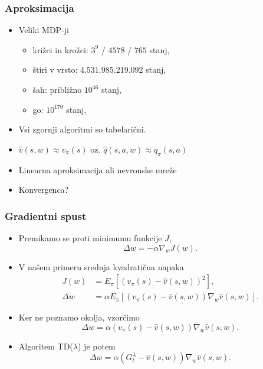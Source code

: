 \documentclass{beamer}    %
\begin{document}
\begin{frame}
    \frametitle{Aproksimacija}
    \begin{itemize}
        \item Veliki MDP-ji 
                \begin{itemize}
                    \item križci in krožci: $3^9$ / $4578$ / $765$ stanj, 
                    \item štiri v vrsto: $4.531.985.219.092$ stanj,
                    \item šah: približno $10^{46}$ stanj, 
                    \item go: $10^{170}$ stanj, 
                \end{itemize}
        \medskip
        \medskip
        \item Vsi zgornji algoritmi so tabelarični.
        \item $\hat{v}(s, w) \approx v_\pi(s)$ oz. $\hat{q}(s, a, w) \approx q_\pi(s, a)$
        \item Linearna aproksimacija ali nevronske mreže
        \item Konvergenca?
    \end{itemize}
\end{frame}


\begin{frame}
    \frametitle{Gradientni spust}
    \begin{itemize}
        \item Premikamo se proti minimumu funkcije $J$, 
            $$
            \Delta w = - \alpha \nabla_wJ(w).
            $$
        \item V našem primeru srednja kvadratična napaka
            \begin{align*}
                J(w) &= E_\pi [(v_\pi(s) - \hat{v}(s, w))^2], \\
                \Delta w &= \alpha E_\pi [(v_\pi(s) - \hat{v}(s, w)) \nabla_w \hat{v}(s, w)].
            \end{align*}
        \item Ker ne poznamo okolja, vzorčimo
            $$
            \Delta w = \alpha (v_\pi(s) - \hat{v}(s, w)) \nabla_w \hat{v}(s, w).
            $$
        \item Algoritem TD($\lambda$) je potem 
            $$
            \Delta w = \alpha (G_t^\lambda - \hat{v}(s, w)) \nabla_w \hat{v}(s, w).
            $$
    \end{itemize}
\end{frame}
\end{document}
